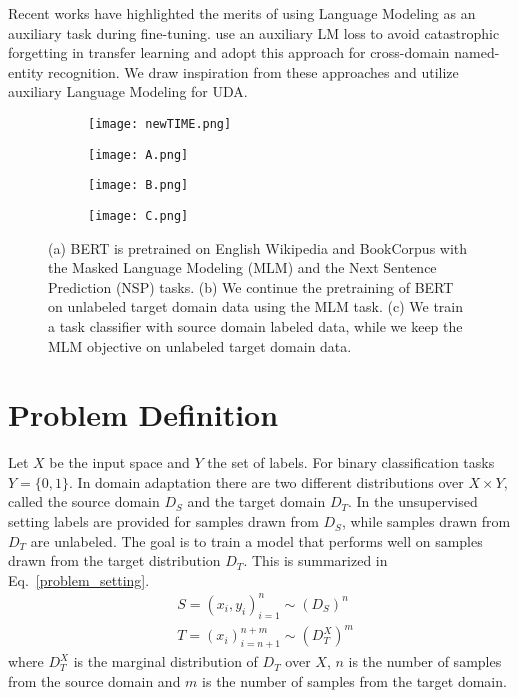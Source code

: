 \documentclass[11pt]{article}
\begin{document}
Recent works have highlighted the merits of using Language Modeling as an auxiliary task during fine-tuning. \citet{chronopoulou-etal-2019-embarrassingly} use an auxiliary LM loss to avoid catastrophic forgetting in transfer learning and \citet{jia-etal-2019-cross} adopt this approach for cross-domain named-entity recognition. We draw inspiration from these approaches and utilize auxiliary Language Modeling for UDA.

\begin{figure*}
\centering
\begin{subfigure}[t]{0.84\textwidth}
\centering
\texttt{[image: newTIME.png]}
\end{subfigure}
\begin{subfigure}[t]{0.27\textwidth}
\centering
\texttt{[image: A.png]}
\caption{}
\label{fig:GPT}
\end{subfigure}
\begin{subfigure}[t]{0.27\textwidth}
\centering
\texttt{[image: B.png]}
\caption{}
\label{fig:DPT}
\end{subfigure}
\begin{subfigure}[t]{0.3\textwidth}
\centering
\texttt{[image: C.png]}
\caption{}
\label{fig:FT}
\end{subfigure}
    
    \caption{(a) BERT \citep{devlin-etal-2019-bert} is pretrained on English Wikipedia and BookCorpus with the Masked Language Modeling (MLM) and the Next Sentence Prediction (NSP) tasks. (b) We continue the pretraining of BERT on unlabeled target domain data using the MLM task. (c) We train a task classifier with source domain labeled data, while we keep the MLM objective on unlabeled target domain data.}
    \label{fig:figure}
\end{figure*}

\section{Problem Definition}
Let \(X\) be the input space and \(Y\) the set of labels. For binary classification tasks \(Y=\{0,1\}\). In domain adaptation there are two different distributions over \(X \times Y\), called the source domain \(D_S\) and the target domain \(D_T\). In the unsupervised setting labels are provided for samples drawn from \(D_S\), while samples drawn from \(D_T\) are unlabeled. The goal is to train a model that performs well on samples drawn from the target distribution \(D_T\). This is summarized in Eq.~\ref{problem_setting}. 
\begin{equation}\label{problem_setting}
\begin{split}
 &	S = {(x_i, y_i)}_{i=1}^n  \sim (D_S)^n \\
 &  T ={(x_i)}_{i=n+1}^{n+m} \sim (D_T^X)^{m} 
\end{split}
\end{equation}
where \(D_T^X\) is the marginal distribution of \(D_T\) over \(X\), \(n\) is the number of samples from the source domain and \(m\) is the number of samples from the target domain.
\end{document}
